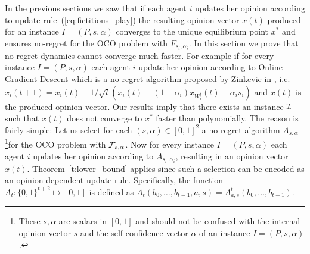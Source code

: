 In the previous sections we saw that if each
agent $i$ updates her opinion according to
update rule~(\ref{eq:fictitious_play})
the resulting opinion vector $x(t)$ produced
for an instance $I=(P,s,\alpha)$ converges
to the unique equilibrium point $x^*$ and
ensures no-regret for the OCO problem
with $F_{s_i,\alpha_i}$. In this section we
prove that no-regret dynamics cannot converge much
faster. For example if for every instance
$I=(P,s,\alpha)$ each agent $i$ update her opinion according
to Online Gradient Descent which is a no-regret algorithm
proposed by Zinkevic in \cite{Z03}, i.e.
$x_i(t+1)= x_i(t) - 1/\sqrt{t}(x_i(t)-(1-\alpha_i)x_{W_i^t}(t)-\alpha_is_i)$
and $x(t)$ is the produced opinion vector.
Our results imply that there exists an instance $\mathcal{I}$
such that $x(t)$ does not converge to $x^*$ faster than polynomially.
The reason is fairly simple: Let us select
for each $(s,\alpha) \in [0,1]^2$ a no-regret algorithm
$A_{s,\alpha}$\footnote{
These $s,\alpha$ are scalars in $[0,1]$ and
should not be confused with the internal opinion vector $s$
and the self confidence vector $\alpha$ of an instance $I=(P,s,\alpha)$.}for the OCO problem with
$\mathcal{F}_{s,\alpha}$. Now for every instance $I=(P,s,\alpha)$ each agent $i$ updates her
opinion according to $A_{s_i,\alpha_i}$,
resulting in an opinion vector $x(t)$.
Theorem~\ref{t:lower_bound} applies since such a selection
can be encoded as an opinion dependent update rule.
Specifically, the function $A_t:\{0,1\}^{t+2} \mapsto [0,1]$ is defined
as $A_t(b_0,\ldots,b_{t-1},a,s) = A^t_{a,s}(b_0,\ldots,b_{t-1})$.

